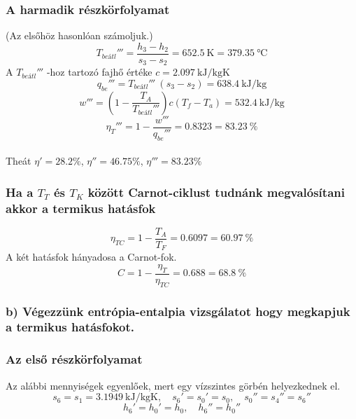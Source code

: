 \subsubsection{A harmadik részkörfolyamat}
(Az elsőhöz hasonlóan számoljuk.)
\begin{equation*}
	T_{be\textit{átl}}'''=\dfrac{h_3-h_2}{s_3-s_2}=\SI{652.5}{\kelvin}
	=
	\SI{379.35}{\celsius}	
\end{equation*}
A $T_{be\textit{átl}}'''$ -hoz tartozó fajhő értéke 
    $c=\SI{2.097}{\kilo\joule\per\kilogram\kelvin}$
\begin{equation*}
	q_{be}'''=T_{be\textit{átl}}''' \!\ \left(s_3-s_2 \right) =\SI{638.4}{\kilo\joule\per\kilogram}
\end{equation*}
\begin{equation*}
	w'''=\left (1-\dfrac{T_A}{T_{be\textit{átl}}'''} \right) c \left(T_f-T_a \right)=\SI{532.4}{\kilo\joule\per\kilogram}	
\end{equation*}
\begin{equation*}
	\eta_T'''=1-\dfrac{w'''}{q_{be}'''}=\SI{0.8323}
	=
	\SI{83.23}{\%}	
\end{equation*}
\\Theát $\eta'={28.2}{\%}$, $\eta''={46.75}{\%}$, $\eta'''={83.23}{\%}$

\subsubsection{Ha a $T_T$ és $T_K$ között Carnot-ciklust tudnánk megvalósítani akkor a termikus hatásfok}
\begin{equation*}
	\eta_{TC}=1-\dfrac{T_A}{T_F}=\SI{0.6097}
	=
	\SI{60.97}{\%}	
\end{equation*}
A két hatásfok hányadosa a Carnot-fok.
\begin{equation*}
	C=1-\dfrac{\eta_T}{\eta_{TC}}=\SI{0.688}
	=
	\SI{68.8}{\%}	
\end{equation*}
 \subsubsection{b) Végezzünk entrópia-entalpia vizsgálatot hogy megkapjuk a termikus hatásfokot.}
 \vspace{0.5cm}
  \subsubsection{Az első részkörfolyamat}
  Az alábbi mennyiségek egyenlőek, mert egy vízszintes görbén helyezkednek el.
  \begin{equation*}
  	s_6=s_1=\SI{3.1949}{\kilo\joule\per\kilogram\kelvin},
  	\quad
  	s_6'=s_0'=s_0,
  	\quad
  	s_0''=s_4''=s_6''	
  \end{equation*}
   \begin{equation*}
 	h_6'=h_0'=h_0,
 	\quad
 	h_6''=h_0''
 	 \end{equation*}

